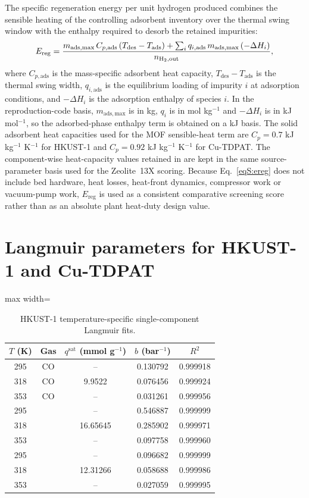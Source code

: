 \documentclass[11pt,a4paper]{article}
\newcommand{\Htwo}{\ce{H2}}
\newcommand{\COtwo}{\ce{CO2}}
\newcommand{\CHfour}{\ce{CH4}}
\begin{document}
The specific regeneration energy per unit hydrogen produced combines the
sensible heating of the controlling adsorbent inventory over the thermal
swing window with the enthalpy required to desorb the retained impurities:
\begin{equation}
E_{\mathrm{reg}} = \frac{
  m_{\mathrm{ads,max}} \, C_{p,\mathrm{ads}} \, (T_{\mathrm{des}} - T_{\mathrm{ads}})
  + \sum_i q_{i,\mathrm{ads}} \, m_{\mathrm{ads,max}} \, (-\Delta H_i)
}{
  n_{\Htwo,\mathrm{out}}
},
\label{eqS:ereg}
\end{equation}
where $C_{p,\mathrm{ads}}$ is the mass-specific adsorbent heat capacity,
$T_{\mathrm{des}} - T_{\mathrm{ads}}$ is the thermal swing width,
$q_{i,\mathrm{ads}}$ is the equilibrium loading of impurity $i$ at
adsorption conditions, and $-\Delta H_i$ is the adsorption enthalpy of
species $i$. In the reproduction-code basis, $m_{\mathrm{ads,max}}$ is in kg,
$q_i$ is in mol kg$^{-1}$ and $-\Delta H_i$ is in kJ mol$^{-1}$, so the
adsorbed-phase enthalpy term is obtained on a kJ basis. The solid adsorbent
heat capacities used for the MOF sensible-heat term are $C_p=0.7$ kJ kg$^{-1}$
K$^{-1}$ for HKUST-1 and $C_p=0.92$ kJ kg$^{-1}$ K$^{-1}$ for Cu-TDPAT. The
component-wise heat-capacity values retained in 
are kept in the same source-parameter basis used for the Zeolite~13X scoring. Because Eq.~\eqref{eqS:ereg}
does not include bed hardware, heat losses, heat-front dynamics, compressor
work or vacuum-pump work, $E_{\mathrm{reg}}$ is used as a consistent
comparative screening score rather than as an absolute plant heat-duty design
value.

\FloatBarrier
\section{Langmuir parameters for HKUST-1 and Cu-TDPAT}

\begin{table}[htbp]
\centering
\caption{HKUST-1 temperature-specific single-component Langmuir fits.}
\label{tabS:hkustfit}
\small
\begin{adjustbox}{max width=\textwidth}
\begin{tabular}{ccccc}
\toprule
$T$ (K) & Gas & $q^{\mathrm{sat}}$ (mmol g$^{-1}$) & $b$ (bar$^{-1}$) & $R^2$ \\
\midrule
295 & CO & -- & 0.130792 & 0.999918 \\
318 & CO & 9.9522 & 0.076456 & 0.999924 \\
353 & CO & -- & 0.031261 & 0.999956 \\
295 & \COtwo{} & -- & 0.546887 & 0.999999 \\
318 & \COtwo{} & 16.65645 & 0.285902 & 0.999971 \\
353 & \COtwo{} & -- & 0.097758 & 0.999960 \\
295 & \CHfour{} & -- & 0.096682 & 0.999999 \\
318 & \CHfour{} & 12.31266 & 0.058688 & 0.999986 \\
353 & \CHfour{} & -- & 0.027059 & 0.999995 \\
\bottomrule
\end{tabular}
\end{adjustbox}
\end{table}
\end{document}
